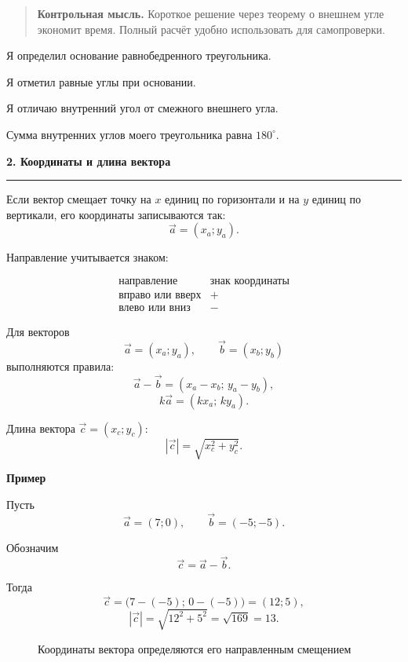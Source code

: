 \documentclass[a4paper,12pt]{article}
\newcommand{\topic}[1]{%
  \par\bigskip
  {\Large\bfseries\color{darkaccent}#1\par}
  \vspace{0.2em}
  {\color{accent}\rule{\linewidth}{0.7pt}}
  \vspace{0.55em}
}
\newcommand{\subtopic}[1]{%
  \par\medskip
  {\large\bfseries\color{darkaccent}#1\par}
  \vspace{0.2em}
}
\newcommand{\control}[1]{%
  \begin{quote}
    \color{darkaccent}\textbf{Контрольная мысль.}\;
    \color{textgray}#1
  \end{quote}
}
\begin{document}
\control{Короткое решение через теорему о внешнем угле экономит время. Полный расчёт удобно использовать для самопроверки.}

\begin{checklist}
  \item Я определил основание равнобедренного треугольника.
  \item Я отметил равные углы при основании.
  \item Я отличаю внутренний угол от смежного внешнего угла.
  \item Сумма внутренних углов моего треугольника равна \(180^\circ\).
\end{checklist}

\topic{2. Координаты и длина вектора}

Если вектор смещает точку на \(x\) единиц по горизонтали и на
\(y\) единиц по вертикали, его координаты записываются так:
\[
\vec a=(x_a;y_a).
\]

Направление учитывается знаком:

\[
\begin{array}{c|c}
\text{направление} & \text{знак координаты} \\ \hline
\text{вправо или вверх} & + \\
\text{влево или вниз} & -
\end{array}
\]

Для векторов
\[
\vec a=(x_a;y_a),
\qquad
\vec b=(x_b;y_b)
\]
выполняются правила:
\[
\vec a-\vec b
=
(x_a-x_b;\,y_a-y_b),
\]
\[
k\vec a=(kx_a;\,ky_a).
\]

Длина вектора \(\vec c=(x_c;y_c)\):
\[
|\vec c|
=
\sqrt{x_c^2+y_c^2}.
\]

\subtopic{Пример}

Пусть
\[
\vec a=(7;0),
\qquad
\vec b=(-5;-5).
\]

Обозначим
\[
\vec c=\vec a-\vec b.
\]

Тогда
\[
\vec c
=
\bigl(7-(-5);\,0-(-5)\bigr)
=
(12;5),
\]
\[
|\vec c|
=
\sqrt{12^2+5^2}
=
\sqrt{169}
=
13.
\]

\begin{figure}[htbp]
  \centering
  \caption{Координаты вектора определяются его направленным смещением}
\end{figure}
\end{document}

